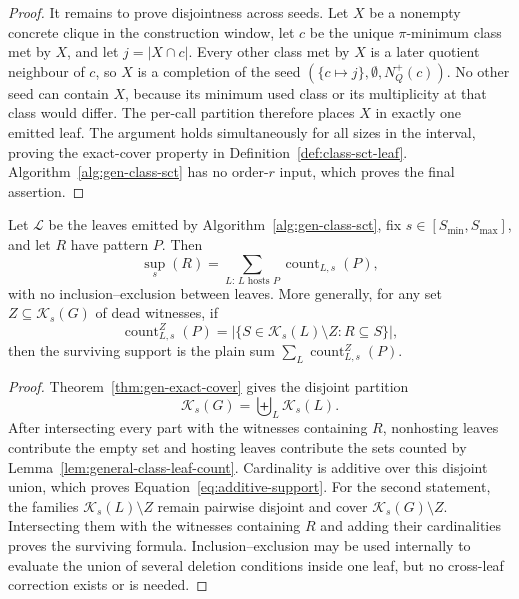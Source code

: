 \begin{proof}
It remains to prove disjointness across seeds.
%
Let $X$ be a nonempty concrete clique in the construction window, let $c$ be the unique $\pi$-minimum class met by $X$, and let $j=|X\cap c|$.
%
Every other class met by $X$ is a later quotient neighbour of $c$, so $X$ is a completion of the seed $(\{c\mapsto j\},\emptyset,N_Q^+(c))$.
%
No other seed can contain $X$, because its minimum used class or its multiplicity at that class would differ.
%
The per-call partition therefore places $X$ in exactly one emitted leaf.
%
The argument holds simultaneously for all sizes in the interval, proving the exact-cover property in Definition~\ref{def:class-sct-leaf}.
%
Algorithm~\ref{alg:gen-class-sct} has no order-$r$ input, which proves the final assertion.
\end{proof}

\begin{theorem}
\label{thm:additive-support}
Let $\mathcal L$ be the leaves emitted by Algorithm~\ref{alg:gen-class-sct}, fix $s\in[S_{\min},S_{\max}]$, and let $R$ have pattern $P$.
%
Then
\begin{equation}
\label{eq:additive-support}
\operatorname{sup}_s(R)
=
\sum_{L:\,L\text{ hosts }P}\operatorname{count}_{L,s}(P),
\end{equation}
with no inclusion--exclusion between leaves.
%
More generally, for any set $Z\subseteq\mathcal K_s(G)$ of dead witnesses, if
\[
\operatorname{count}^{Z}_{L,s}(P)
=
|\{S\in\mathcal K_s(L)\setminus Z:R\subseteq S\}|,
\]
then the surviving support is the plain sum $\sum_L\operatorname{count}^{Z}_{L,s}(P)$.
\end{theorem}
\begin{proof}
Theorem~\ref{thm:gen-exact-cover} gives the disjoint partition
\[
\mathcal K_s(G)=\biguplus_L\mathcal K_s(L).
\]
%
After intersecting every part with the witnesses containing $R$, nonhosting leaves contribute the empty set and hosting leaves contribute the sets counted by Lemma~\ref{lem:general-class-leaf-count}.
%
Cardinality is additive over this disjoint union, which proves Equation~\eqref{eq:additive-support}.
%
For the second statement, the families $\mathcal K_s(L)\setminus Z$ remain pairwise disjoint and cover $\mathcal K_s(G)\setminus Z$.
%
Intersecting them with the witnesses containing $R$ and adding their cardinalities proves the surviving formula.
%
Inclusion--exclusion may be used internally to evaluate the union of several deletion conditions inside one leaf, but no cross-leaf correction exists or is needed.
\end{proof}

